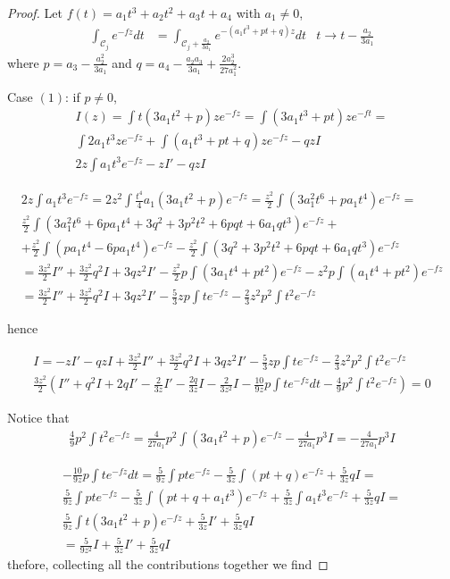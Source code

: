 \documentclass[11pt,a4paper,twoside,leqno,noamsfonts]{amsart}
\numberwithin{equation}{section}
\begin{document}
\begin{proof}
Let $f(t)=a_1t^3+a_2t^2+a_3t+a_4$ with $a_1\neq 0$, 
\begin{align*}
\int_{\mathcal{C}_j}e^{-fz}dt&=\int_{\mathcal{C}_j+\frac{a_2}{3a_1}}e^{-(a_1t^3+pt+q)z}dt & t\to t-\frac{a_2}{3a_1}
\end{align*}
where $p=a_3-\frac{a_2^2}{3a_1}$ and $q=a_4-\frac{a_2a_3}{3a_1}+\frac{2a_2^3}{27a_1^2}$.

Case $(1)$: if $p\neq 0$,
\begin{align*}
I(z)=\int t(3a_1t^2+p)ze^{-fz}=\int(3a_1t^3+pt)ze^{-ft}=\\
\int2a_1t^3ze^{-fz}+\int(a_1t^3+pt+q)ze^{-fz}-qzI\\
2z\int a_1t^3e^{-fz}-zI'-qzI
\end{align*}

\begin{align*}
2z\int a_1t^3e^{-fz}=2z^2\int\frac{t^4}{4}a_1(3a_1t^2+p)e^{-fz}=\frac{z^2}{2}\int (3a_1^2t^6+pa_1t^4)e^{-fz}=\\
\frac{z^2}{2}\int(3a_1^2t^6+6pa_1t^4+3q^2+3p^2t^2+6pqt+6a_1qt^3)e^{-fz}+\\
+\frac{z^2}{2}\int(pa_1t^4-6pa_1t^4)e^{-fz}-\frac{z^2}{2}\int(3q^2+3p^2t^2+6pqt+6a_1qt^3)e^{-fz}\\
=\frac{3z^2}{2}I''+\frac{3z^2}{2}q^2I+3qz^2I'-\frac{z^2}{2}p\int(3a_1t^4+pt^2)e^{-fz}-z^2p\int(a_1t^4+pt^2)e^{-fz}\\
=\frac{3z^2}{2}I''+\frac{3z^2}{2}q^2I+3qz^2I'-\frac{5}{3}zp\int te^{-fz}-\frac{2}{3}z^2p^2\int t^2e^{-fz}
\end{align*}

hence 

\begin{align}
I=-zI'-qzI+\frac{3z^2}{2}I''+\frac{3z^2}{2}q^2I+3qz^2I'-\frac{5}{3}zp\int te^{-fz}-\frac{2}{3}z^2p^2\int t^2e^{-fz}\\
\frac{3z^2}{2}\left(I''+q^2I+2qI'-\frac{2}{3z}I'-\frac{2q}{3z}I-\frac{2}{3z^2}I-\frac{10}{9z}p\int te^{-fz}dt-\frac{4}{9}p^2\int t^2e^{-fz}\right)=0 
\end{align}

Notice that 
\begin{align*}
\frac{4}{9}p^2\int t^2e^{-fz}=\frac{4}{27a_1}p^2\int(3a_1t^2+p)e^{-fz}-\frac{4}{27a_1}p^3I=-\frac{4}{27a_1}p^3I
\end{align*}

\begin{align*}
-\frac{10}{9z}p\int te^{-fz}dt=\frac{5}{9z}\int pte^{-fz}-\frac{5}{3z}\int(pt+q)e^{-fz}+\frac{5}{3z}qI=\\
\frac{5}{9z}\int pte^{-fz}-\frac{5}{3z}\int(pt+q+a_1t^3)e^{-fz}+\frac{5}{3z}\int a_1t^3e^{-fz}+\frac{5}{3z}qI=\\
\frac{5}{9z}\int t(3a_1t^2+p)e^{-fz}+\frac{5}{3z}I'+\frac{5}{3z}qI\\
=\frac{5}{9z^2}I+\frac{5}{3z}I'+\frac{5}{3z}qI
\end{align*}
thefore, collecting all the contributions together we find 


\end{proof}
\end{document}
